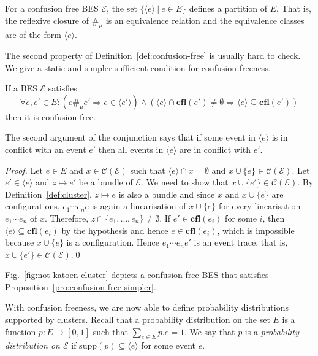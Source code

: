 \documentclass{llncs}
\newcommand{\C}{\mathcal{C}}
\newcommand{\EE}{\mathcal{E}}
\newcommand{\cfl}{\mathbf{cfl}}
\newcommand{\<}{\langle}
\renewcommand{\>}{\rangle}
\newcommand{\supp}{\mathrm{supp}}
\begin{document}
\begin{proposition}\label{pro:confusion-free-theorem}
For a confusion free BES $\EE$, the set $\{\<e\>\ |\ e\in E\}$ defines a partition of $E$. That is, the reflexive closure of $\#_\mu$ is an equivalence relation and the equivalence classes are of the form $\<e\>$.
\end{proposition}

The second property of Definition~\ref{def:confusion-free} is usually hard to check. We give a static and simpler sufficient condition for confusion freeness.
\begin{proposition}\label{pro:confusion-free-simpler}
If a BES $\EE$ satisfies 
$$\forall e,e'\in E:(e\#_\mu e'\Rightarrow e\in\<e'\>)\wedge( \<e\>\cap\cfl(e')\neq\emptyset\Rightarrow \<e\>\subseteq\cfl(e'))$$
then it is confusion free.
\end{proposition}

The second argument of the conjunction says that if some event in $\<e\>$ is in conflict with an event $e'$ then all events in $\<e\>$ are in conflict with $e'$.

\begin{proof}
Let $e\in E$ and $x\in \C(\EE)$ such that $\<e\>\cap x = \emptyset$ and $x\cup\{e\}\in\C(\EE)$. Let $e'\in\<e\>$ and $z\mapsto e'$ be a bundle of $\EE$. We need to show that $x\cup\{e'\}\in\C(\EE)$. By Definition~\ref{def:cluster}, $z\mapsto e$ is also a bundle and since $x$ and $x\cup\{e\}$ are configurations, $e_1\cdots e_n e$ is again a linearisation of $x\cup\{e\}$ for every linearisation $e_1\cdots e_n$  of $x$. Therefore, $z\cap\{e_1,\dots,e_n\}\neq\emptyset$. If $e'\in\cfl(e_i)$ for some $i$, then $\<e\>\subseteq\cfl(e_i)$ by the hypothesis and hence $e\in\cfl(e_i)$, which is impossible because $x\cup\{e\}$ is a configuration. Hence $e_1\cdots e_ne'$ is an event trace, that is, $x\cup\{e'\}\in\C(\EE)$.\qed
\end{proof}

\begin{example}
Fig.~\ref{fig:not-katoen-cluster} depicts a confusion free BES that satisfies Proposition~\ref{pro:confusion-free-simpler}.
\end{example}

With confusion freeness, we are now able to define probability distributions supported by clusters. Recall that a probability distribution on the set $E$ is a function $p:E\to[0,1]$ such that $\sum_{e\in E}p.e = 1$. We say that $p$ is a \textit{probability distribution on $\EE$} if $\supp(p)\subseteq\<e\>$ for some event $e$.
\end{document}
